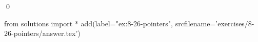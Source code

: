
\begin{ex}
  \label{ex:8-26-pointers}
  
  \qed
\end{ex}
\begin{python0}
from solutions import *
add(label="ex:8-26-pointers",
    srcfilename='exercises/8-26-pointers/answer.tex')
\end{python0}
